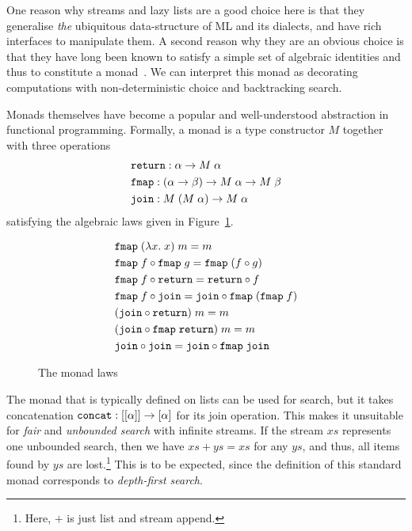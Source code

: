 One reason why streams and lazy lists are a good choice here is that they generalise \emph{the} ubiquitous data-structure of ML and its dialects, and have rich interfaces to manipulate them. A second reason why they are an obvious choice is that they have long been known to satisfy a simple set of algebraic identities and thus to constitute a monad~\cite{MonadWadler}. We can interpret this monad as decorating computations with non-deterministic choice and backtracking search.

Monads themselves have become a popular and well-understood abstraction in functional programming. Formally, a monad is a type constructor $M$ together with three operations 
\begin{align*}
&\texttt{return} : \alpha \rightarrow M\;\alpha\\
&\texttt{fmap} : (\alpha \rightarrow \beta) \rightarrow M\;\alpha \rightarrow M\;\beta\\
&\texttt{join} : M\;(M\;\alpha) \rightarrow M\;\alpha
\end{align*}
satisfying the algebraic laws given in Figure~\ref{fig:MonadLaws}.

\begin{figure}
\begin{align}
&\texttt{fmap}\;(\lambda x.\;x)\;m = m\notag\\
&\texttt{fmap}\;f \circ \texttt{fmap}\;g = \texttt{fmap}\;(f \circ g)\notag\\
&\texttt{fmap}\;f \circ \texttt{return} = \texttt{return}\circ f\notag\\
&\texttt{fmap}\;f \circ \texttt{join} = \texttt{join} \circ \texttt{fmap}\;(\texttt{fmap}\;f)\notag\\
&(\texttt{join} \circ \texttt{return})\;m = m\notag\\
&(\texttt{join} \circ \texttt{fmap}\;\texttt{return})\;m = m\notag\\
&\texttt{join} \circ \texttt{join} = \texttt{join} \circ \texttt{fmap}\;\texttt{join} \label{eq:JoinAssoc}
\end{align}
\label{fig:MonadLaws}
\caption{The monad laws}
\end{figure}

The monad that is typically defined on lists can be used for search, but it takes concatenation $\texttt{concat} : [[\alpha]] \rightarrow [\alpha]$ for its join operation. This makes it unsuitable for \emph{fair} and \emph{unbounded search} with infinite streams. If the stream $xs$ represents one unbounded search, then we have $xs + ys = xs$ for any $ys$, and thus, all items found by $ys$ are lost.\footnote{Here, $+$ is just list and stream append.} This is to be expected, since the definition of this standard monad corresponds to \emph{depth-first search}. 

